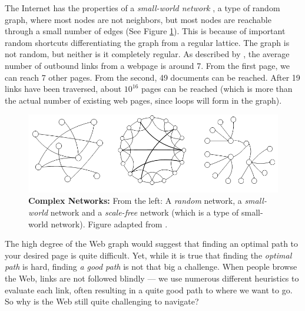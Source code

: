 The Internet has the properties of a \emph{small-world network} \citep{Newman2000}, 
a type of random graph, where most nodes are not neighbors, but most nodes are reachable through a small number of edges (See Figure \ref{fig:swn}). 
This is because of important random shortcuts differentiating the graph from a regular lattice. 
The graph is not  random, but neither is it completely regular.
As described by \citet[p37]{Barabasi2003}, the average number of outbound links from a webpage is around 7.
From the first page, we can reach 7 other pages. From the second, 49 documents can be reached. 
After 19 links have been traversed, about $10^{16}$ pages can be reached (which is more than the actual number of existing web pages, since loops will form in the graph).

\begin{figure}[t]
  \includegraphics[width=\textwidth]{../graphics/graphs}
  \caption[Complex Networks]{
    \textbf{Complex Networks:} 
    From the left: A \emph{random} network, a \emph{small-world} network and a \emph{scale-free} network 
    (which is a type of  small-world network). Figure adapted from \cite{Huang2005}.} 
  \label{fig:swn}
\end{figure}

The high degree of the Web graph would suggest that finding an optimal path to your desired page is quite difficult. 
Yet, while it is true that finding the \emph{optimal path} is hard, finding \emph{a good path} is not that big a challenge. 
When people browse the Web, links are not followed blindly --- we use numerous different heuristics to evaluate each link, often resulting in a quite good path to where we want to go. 
So why is the Web still quite challenging to navigate?

